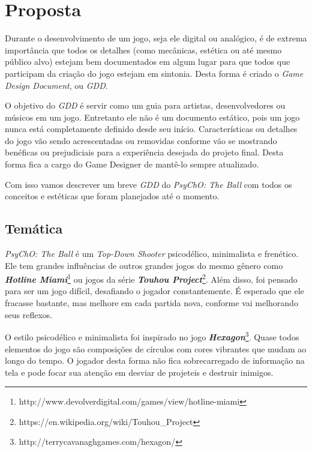 
\chapter{Proposta}
\label{cap:proposta}

Durante o desenvolvimento de um jogo, seja ele digital ou analógico, é de extrema importância
que todos os detalhes (como mecânicas, estética ou até mesmo público alvo) estejam bem documentados
em algum lugar para que todos que participam da criação do jogo estejam em sintonia. Desta forma
é criado o \textit{Game Design Document}, ou \textit{GDD}.

O objetivo do \textit{GDD} é servir como um guia para artistas, desenvolvedores ou músicos em um
jogo. Entretanto ele não é um documento estático, pois um jogo nunca está completamente definido desde seu
início. Características ou detalhes do jogo vão sendo acrescentadas ou removidas conforme vão se mostrando
benéficas ou prejudiciais para a experiência desejada do projeto final. Desta forma fica a cargo do Game
Designer de mantê-lo sempre atualizado.

Com isso vamos descrever um breve \textit{GDD} do \textit{PsyChO: The Ball} com todos os conceitos e
estéticas que foram planejados até o momento.

\section{Temática}
\label{sec:tematica}

\textit{PsyChO: The Ball} é um \textit{Top-Down Shooter} psicodélico, minimalista e frenético. Ele tem grandes influências de
outros grandes jogos do mesmo gênero como \textbf{\textit{Hotline Miami}}\footnote{http://www.devolverdigital.com/games/view/hotline-miami} ou
jogos da série \textbf{\textit{Touhou Project}}\footnote{https://en.wikipedia.org/wiki/Touhou\_Project}. Além disso, foi pensado para ser um jogo
difícil, desafiando o jogador constantemente. É esperado que ele fracasse bastante, mas melhore em cada partida nova, conforme vai melhorando
seus reflexos.

O estilo psicodélico e minimalista foi inspirado no jogo \textbf{\textit{Hexagon}}\footnote{http://terrycavanaghgames.com/hexagon/}. Quase
todos elementos do jogo são composições de círculos com cores vibrantes que mudam ao longo do tempo. O jogador desta forma não fica sobrecarregado de
informação na tela e pode focar sua atenção em desviar de projeteis e destruir inimigos.

